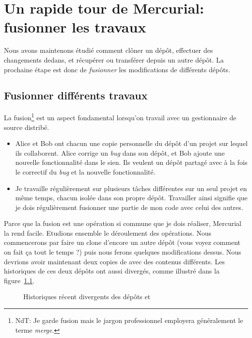 \chapter{Un rapide tour de Mercurial: fusionner les travaux}
\label{chap:tour-merge}

Nous avons maintenons étudié comment clôner un dépôt, effectuer
des changements dedans, et récupérer ou transférer depuis un 
autre dépôt. La prochaine étape est donc de \emph{fusionner} les
modifications de différents dépôts.

\section{Fusionner différents travaux} %
La fusion\footnote{NdT: Je garde fusion mais le jargon professionnel 
employera généralement le terme \textit{merge}.} est un aspect 
fondamental lorsqu'on travail avec un gestionnaire de source 
distribé.
\begin{itemize}
\item Alice et Bob ont chacun une copie personnelle du dépôt d'un
  projet sur lequel ils collaborent. Alice corrige un \textit{bug} 
  dans son dépôt, et Bob ajoute une nouvelle fonctionnalité dans le
  sien. Ils veulent un dépôt partagé avec à la fois le correctif du
  \textit{bug} et la nouvelle fonctionnalité.
\item Je travaille régulièrement sur plusieurs tâches différentes sur
  un seul projet en même temps, chacun isolée dans son propre dépôt.
  Travailler ainsi signifie que je dois régulièrement fusionner une 
  partie de mon code avec celui des autres.
\end{itemize}

Parce que la fusion est une opération si commune que je dois réaliser,
Mercurial la rend facile. Etudions ensemble le déroulement des opérations.
Nous commencerons par faire un clone d'encore un autre dépôt (vous voyez
comment on fait ça tout le temps ?) puis nous ferons quelques modifications
dessus.
Nous devrions avoir maintenant deux copies de  avec 
des contenus différents. Les historiques de ces deux dépôts ont aussi 
divergés, comme illustré dans la figure~\ref{fig:tour-merge:sep-repos}.


\begin{figure}[ht]
  \centering
  \caption{Historiques récent divergents des dépôts  
  et }
  \label{fig:tour-merge:sep-repos}
\end{figure}

